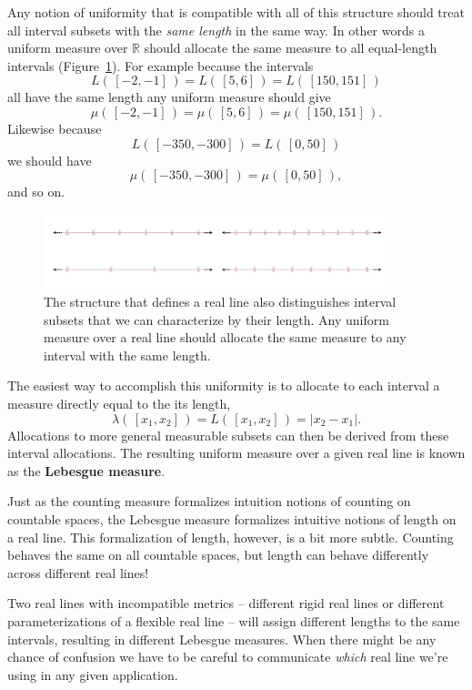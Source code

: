 \documentclass[
  letterpaper,
  DIV=11,
  numbers=noendperiod]{scrartcl}
\begin{document}
Any notion of uniformity that is compatible with all of this structure
should treat all interval subsets with the \emph{same length} in the
same way. In other words a uniform measure over \(\mathbb{R}\) should
allocate the same measure to all equal-length intervals
(Figure~\ref{fig-equal-length-intervals}). For example because the
intervals \[
L( \, [-2, -1] \, ) = L( \, [5, 6] \, ) = L( \, [150, 151] \,)
\] all have the same length any uniform measure should give \[
\mu( \, [-2, -1] \, ) = \mu( \, [5, 6] \, ) = \mu( \, [150, 151] \, ).
\] Likewise because \[
L( \, [-350, -300] \, ) = L( \, [0, 50] \, )
\] we should have \[
\mu( \, [-350, -300] \, ) = \mu( \, [0, 50] \,),
\] and so on.

\begin{figure}

{\centering \includegraphics[width=0.9\textwidth,height=\textheight]{figures/interval_partitions/interval_partitions.pdf}

}

\caption{\label{fig-equal-length-intervals}The structure that defines a
real line also distinguishes interval subsets that we can characterize
by their length. Any uniform measure over a real line should allocate
the same measure to any interval with the same length.}

\end{figure}

The easiest way to accomplish this uniformity is to allocate to each
interval a measure directly equal to the its length, \[
\lambda( \, [x_{1}, x_{2}] \, )
= L( \, [x_{1}, x_{2}] \, )
= | x_{2} - x_{1} |.
\] Allocations to more general measurable subsets can then be derived
from these interval allocations. The resulting uniform measure over a
given real line is known as the \textbf{Lebesgue measure}.

Just as the counting measure formalizes intuition notions of counting on
countable spaces, the Lebesgue measure formalizes intuitive notions of
length on a real line. This formalization of length, however, is a bit
more subtle. Counting behaves the same on all countable spaces, but
length can behave differently across different real lines!

Two real lines with incompatible metrics -- different rigid real lines
or different parameterizations of a flexible real line -- will assign
different lengths to the same intervals, resulting in different Lebesgue
measures. When there might be any chance of confusion we have to be
careful to communicate \emph{which} real line we're using in any given
application.
\end{document}

